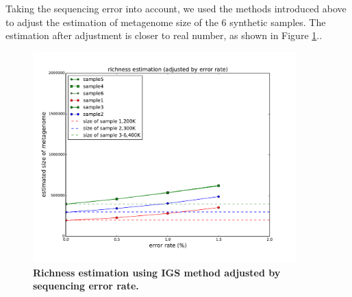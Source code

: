 Taking the sequencing error into account, we used the methods introduced above
to adjust the estimation of metagenome size of the 6 synthetic samples. The
estimation after adjustment is closer to real number, as shown in Figure
\ref{fig:IGS_richness_error_adjustment}..


\begin{figure}[!ht]
 \centerline{\includegraphics[width=4in]{./figures/alpha_by_error_erroronly_adjust.pdf}}
\caption{\bf Richness estimation using IGS method adjusted by sequencing error
rate.}
\label{fig:IGS_richness_error_adjustment}
\end{figure}


